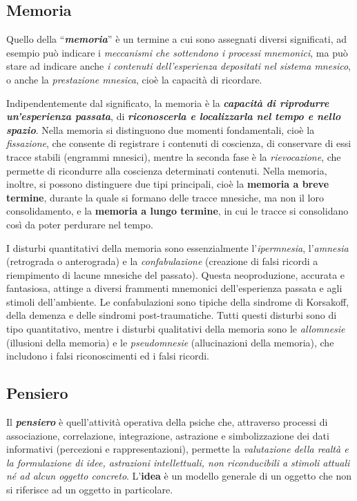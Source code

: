 \subsection{Memoria}

Quello della ``\textbf{\emph{memoria}}'' è un termine a cui sono
assegnati diversi significati, ad esempio può indicare i
\emph{meccanismi che sottendono i processi mnemonici}, ma può stare ad
indicare anche \emph{i contenuti dell'esperienza depositati nel sistema
mnesico}, o anche la \emph{prestazione mnesica}, cioè la capacità di
ricordare.

Indipendentemente dal significato, la memoria è la
\textbf{\emph{capacità di riprodurre un'esperienza passata}}, di
\textbf{\emph{riconoscerla e localizzarla nel tempo e nello spazio}}.
Nella memoria si distinguono due momenti fondamentali, cioè la
\emph{fissazione}, che consente di registrare i contenuti di coscienza,
di conservare di essi tracce stabili (engrammi mnesici), mentre la
seconda fase è la \emph{rievocazione}, che permette di ricondurre alla
coscienza determinati contenuti. Nella memoria, inoltre, si possono
distinguere due tipi principali, cioè la \textbf{memoria a breve
termine}, durante la quale si formano delle tracce mnesiche, ma non il
loro consolidamento, e la \textbf{memoria a lungo termine}, in cui le
tracce si consolidano così da poter perdurare nel tempo.

I disturbi quantitativi della memoria sono essenzialmente
l'\emph{ipermnesia}, l'\emph{amnesia} (retrograda o anterograda) e la
\emph{confabulazione} (creazione di falsi ricordi a riempimento di
lacune mnesiche del passato). Questa neoproduzione, accurata e
fantasiosa, attinge a diversi frammenti mnemonici dell'esperienza
passata e agli stimoli dell'ambiente. Le confabulazioni sono tipiche
della sindrome di Korsakoff, della demenza e delle sindromi
post-traumatiche. Tutti questi disturbi sono di tipo quantitativo,
mentre i disturbi qualitativi della memoria sono le \emph{allomnesie}
(illusioni della memoria) e le \emph{pseudomnesie} (allucinazioni della
memoria), che includono i falsi riconoscimenti ed i falsi ricordi.

\subsection{Pensiero}

Il \textbf{\emph{pensiero}} è quell'attività operativa della psiche che,
attraverso processi di associazione, correlazione, integrazione,
astrazione e simbolizzazione dei dati informativi (percezioni e
rappresentazioni), permette la \emph{valutazione della realtà e la
formulazione di idee, astrazioni intellettuali, non riconducibili a
stimoli attuali né ad alcun oggetto concreto}. L'\textbf{idea} è un
modello generale di un oggetto che non si riferisce ad un oggetto in
particolare.

